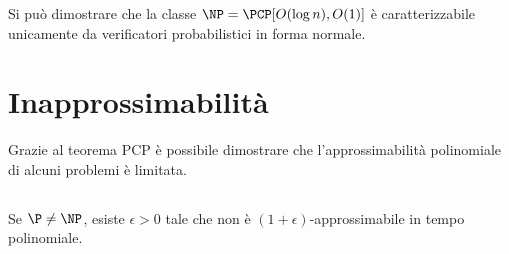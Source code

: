 Si può dimostrare che la classe $\NP=\PCP[O(\log n),O(1)]$ è caratterizzabile unicamente da verificatori probabilistici in forma normale.



\section{Inapprossimabilità}
Grazie al teorema PCP è possibile dimostrare che l'approssimabilità polinomiale di alcuni problemi è limitata.


\subsection{\MaxSat}
\begin{theorem}
	Se $\P\neq\NP$, esiste $\epsilon>0$ tale che \MaxSat non è $(1+\epsilon)$-approssimabile in tempo polinomiale.
\end{theorem}
